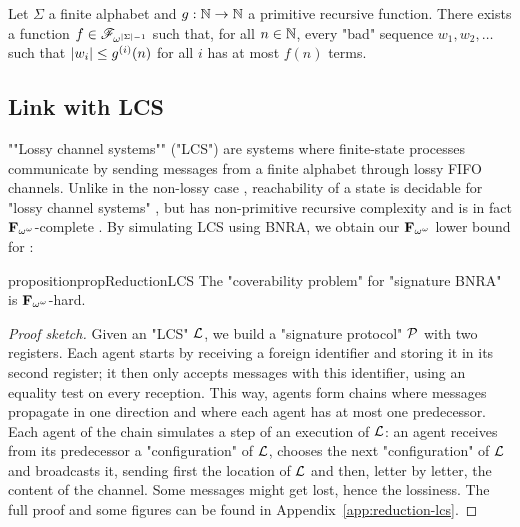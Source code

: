 \begin{theorem}
	\label{thm:lengthfcttheorem}
	Let $\Sigma$ a finite alphabet and $g : \mathbb{N} \to \mathbb{N}$ a primitive recursive function.
	There exists a function $f \in \mathscr{F}_{\omega^{|\Sigma| - 1}}$ such that, for all $n \in \mathbb{N}$, every "bad" sequence $w_1, w_2, \ldots$ such that $|w_i| \leq g^{(i)}(n)$ for all $i$ has at most $f(n)$ terms. 
\end{theorem}



\subsection{Link with LCS}

""Lossy channel systems"" ("LCS") are systems where finite-state processes communicate by sending messages from a finite alphabet through lossy FIFO channels. Unlike in the non-lossy case \cite{BZ83}, reachability of a state is decidable for "lossy channel systems" \cite{AbdullaJ1996verif}, but has non-primitive recursive complexity \cite{Schnoebelen2002verifying} and is in fact $\mathbf{F}_{\omega^{\omega}}$-complete \cite{ChambartS08ordinal}. 
By simulating LCS using BNRA, we obtain our $\mathbf{F}_{\omega^{\omega}}$ lower bound for \COVER:

\begin{restatable}{proposition}{propReductionLCS}
	\label{prop:reduction-LCS}
	The "coverability problem" for "signature BNRA" is $\mathbf{F}_{\omega^\omega}$-hard.
\end{restatable}
\begin{proof}[Proof sketch]
Given an "LCS" $\mathcal{L}$, we build a "signature protocol" $\mathcal{P}$ with two registers. 
Each agent starts by receiving a foreign identifier and storing it in its second register; it then only accepts messages with this identifier, using an equality test on every reception.
 This way, agents form chains where messages propagate in one direction and where each agent has at most one predecessor. 
 Each agent of the chain simulates a step of an execution of $\mathcal{L}$: an agent receives from its predecessor a "configuration" of $\mathcal{L}$, chooses the next "configuration" of $\mathcal{L}$ and broadcasts it, sending first the location of $\mathcal{L}$ and then, letter by letter, the content of the channel. 
 Some messages might get lost, hence the lossiness. 
 The full proof and some figures can be found in Appendix~\ref{app:reduction-lcs}. 
\end{proof}




